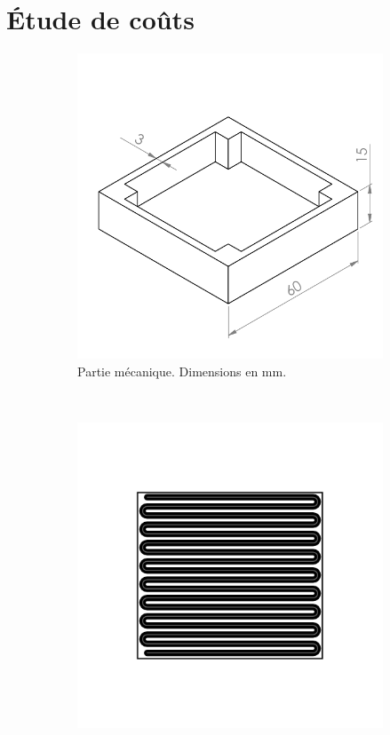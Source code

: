 \section{Étude de coûts}

\begin{figure}[h]
        \centering
        \begin{subfigure}[t]{0.4\textwidth}
            \includegraphics[width=\textwidth]{images/example_part/example_mid}
            \caption{Partie mécanique. Dimensions en \si{\milli\meter}.}
        \end{subfigure}
        ~
        \begin{subfigure}[t]{0.4\textwidth}
                \includegraphics[width=\textwidth]{images/example_part/tracks.png}

\end{subfigure}
\end{figure}

